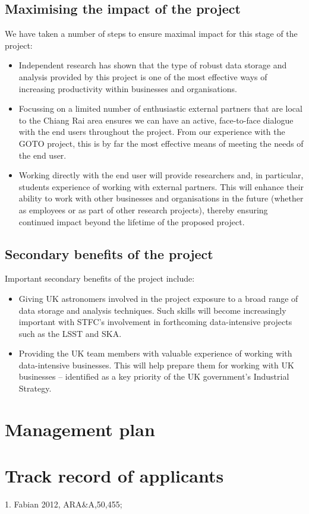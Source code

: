 \documentclass[11pt]{article}
\begin{document}
\subsection{Maximising the impact of the project}
We have taken a number of steps to ensure maximal impact for this stage of the project:
\begin{itemize}[leftmargin=6mm]
  \item Independent research has shown that the type of robust data storage and analysis provided by this project is one of the most effective ways of increasing productivity within businesses and organisations. 
  \item Focussing on a limited number of enthusiastic external partners that are local to the Chiang Rai area ensures we can have an active, face-to-face dialogue with the end users throughout the project. From our experience with the GOTO project, this is by far the most effective means of meeting the needs of the end user.
  \item Working directly with the end user will provide researchers and, in particular, students experience of working with external partners. This will enhance their ability to work with other businesses and organisations in the future (whether as employees or as part of other research projects), thereby ensuring continued impact beyond the lifetime of the proposed project. 
\end{itemize}

\subsection{Secondary benefits of the project}
Important secondary benefits of the project include:
\begin{itemize}[leftmargin=6mm]
  \item Giving UK astronomers involved in the project exposure to a broad range of data storage and analysis techniques. Such skills will become increasingly important with STFC's involvement in forthcoming data-intensive projects such as the LSST and SKA.
  \item Providing the UK team members with valuable experience of working with data-intensive businesses. This will help prepare them for working with UK businesses -- identified as a key priority of the UK government's Industrial Strategy.   
\end{itemize}

\section{Management plan}

\section{Track record of applicants}


\vspace{10mm}
 {\scriptsize 1. Fabian 2012,
  ARA\&A,50,455;
}
\end{document}
